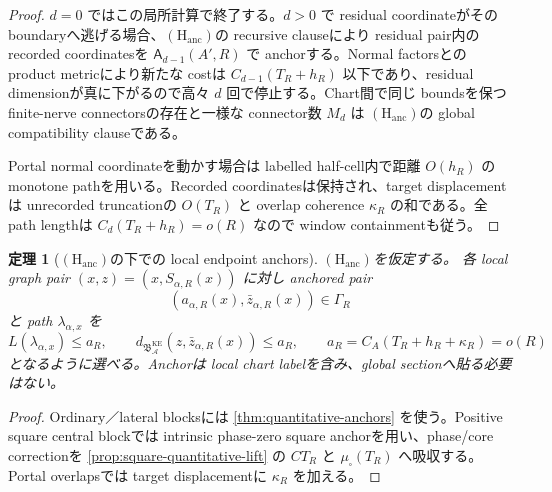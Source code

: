 \documentclass[11pt,a4paper]{ltjsarticle}
\newcommand{\cA}{\mathcal A}\newcommand{\cB}{\mathcal B}\newcommand{\cC}{\mathcal C}
\newcommand{\BKE}{\mathfrak B_{\cA}^{\mathrm{KE}}}
\newcommand{\Hanc}{\ensuremath{(\mathrm H_{\mathrm{anc}})}}
\theoremstyle{plain}
\newtheorem{theorem}{定理}[section]\newtheorem{proposition}[theorem]{命題}
\theoremstyle{definition}
\theoremstyle{remark}
\begin{document}
\begin{proof}
$d=0$ ではこの局所計算で終了する。$d>0$ で residual coordinateがその boundaryへ逃げる場合、\Hanc の recursive clauseにより residual pair内の recorded coordinatesを $\mathsf A_{d-1}(A',R)$ で anchorする。Normal factorsとの product metricにより新たな costは $C_{d-1}(T_R+h_R)$ 以下であり、residual dimensionが真に下がるので高々 $d$ 回で停止する。Chart間で同じ boundsを保つ finite-nerve connectorsの存在と一様な connector数 $M_d$ は \Hanc の global compatibility clauseである。

Portal normal coordinateを動かす場合は labelled half-cell内で距離 $O(h_R)$ の monotone pathを用いる。Recorded coordinatesは保持され、target displacementは unrecorded truncationの $O(T_R)$ と overlap coherence $\kappa_R$ の和である。全 path lengthは $C_d(T_R+h_R)=o(R)$ なので window containmentも従う。
\end{proof}

\begin{theorem}[\Hanc の下での local endpoint anchors]\label{thm:component-control-data}
\Hanc を仮定する。
各 local graph pair $(x,z)=(x,S_{\alpha,R}(x))$ に対し anchored pair
\[
 (a_{\alpha,R}(x),\bar z_{\alpha,R}(x))\in\Gamma_R
\]
と path $\lambda_{\alpha,x}$ を
\[
 L(\lambda_{\alpha,x})\le a_R,
 \qquad
 d_{\BKE}(z,\bar z_{\alpha,R}(x))\le a_R,
 \qquad
 a_R=C_A(T_R+h_R+\kappa_R)=o(R)
\]
となるように選べる。Anchorは local chart labelを含み、global sectionへ貼る必要はない。
\end{theorem}

\begin{proof}
Ordinary／lateral blocksには \cref{thm:quantitative-anchors} を使う。Positive square central blockでは intrinsic phase-zero square anchorを用い、phase/core correctionを \cref{prop:square-quantitative-lift} の $CT_R$ と $\mu_\square(T_R)$ へ吸収する。Portal overlapsでは target displacementに $\kappa_R$ を加える。
\end{proof}
\end{document}
